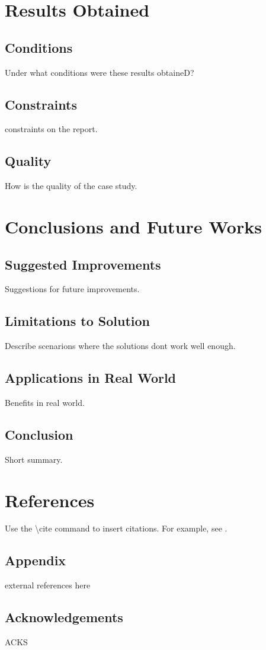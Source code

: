 \documentclass{article}
\begin{document}
\section{Results Obtained}
\subsection{Conditions}
Under what conditions were these results obtaineD?

\subsection{Constraints}
constraints on the report.

\subsection{Quality}
How is the quality of the case study.

\section{Conclusions and Future Works}
\subsection{Suggested Improvements}
Suggestions for future improvements.

\subsection{Limitations to Solution}
Describe scenarions where the solutions dont work well enough.

\subsection{Applications in Real World}
Benefits in real world.

\subsection{Conclusion}
Short summary.

\section{References}
Use the \textbackslash cite command to insert citations. For example, see \cite{reference1}.

\subsection{Appendix}
external references here

\subsection{Acknowledgements}
ACKS



\end{document}
